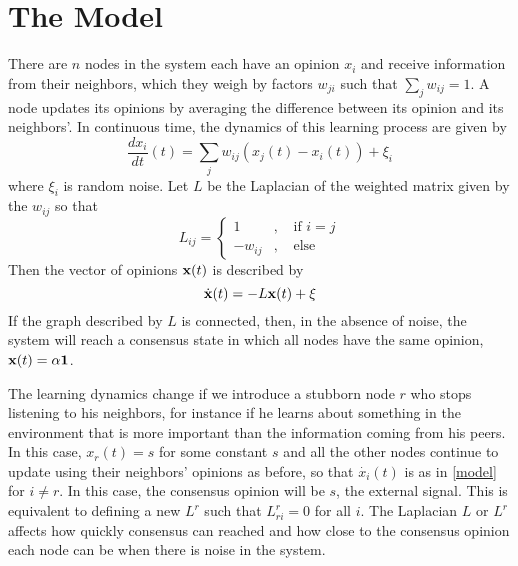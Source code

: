 \documentclass{article}
\begin{document}
\section{The Model}

There are $n$ nodes in the system each have an opinion $x_i$ and receive information from their neighbors, which they weigh by factors $w_{ji}$ such that $\sum_jw_{ij}=1$.   A node updates its opinions by averaging the difference between its opinion and its neighbors'.  In continuous time, the dynamics of this learning process are given by
\begin{equation}
\frac{d x_i}{dt}(t)=\sum_jw_{ij}(x_j(t)-x_i(t))+\xi_i \label{model}
\end{equation}
where $\xi_i$ is random noise.  Let $L$ be the Laplacian of the weighted matrix given by the $w_{ij}$ so that
\begin{equation}
L_{ij}=\left\{\begin{array}{cccc}  \label{lap}
1& , & \text{ if } i=j \\ 
-w_{ij} & , & \text{ else}
\end{array}\right. \end{equation}
Then the vector of opinions ${\bf x}(t)$ is described by 
\begin{equation}
\dot{{\bf x}}(t)=-L{\bf x}(t)+\xi \label{vecmodel}
\end{equation}
If the graph described by $L$ is connected, then, in the absence of noise, the system will reach a consensus state in which all nodes have the same opinion, ${\bf x}(t)=\alpha{\bf 1}$.  

The learning dynamics change if we introduce a stubborn node $r$ who stops listening to his neighbors, for instance if he learns about something in the environment that is more important than the information coming from his peers.  In this case, $x_r(t)=s$ for some constant $s$ and all the other nodes continue to update using their neighbors' opinions as before, so that $\dot{x_i}(t)$ is as in \ref{model} for $i\neq r$.  In this case, the consensus opinion will be $s$, the external signal.  This is equivalent to defining a new $L^r$ such that $L^r_{ri}=0$ for all $i$.
The Laplacian $L$ or $L^r$ affects how quickly consensus can reached and how close to the consensus opinion each node can be when there is noise in the system.  
\end{document}
